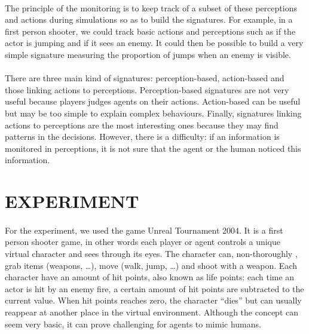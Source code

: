 \documentclass[a4paper,twocolumn]{article}
\begin{document}
\paragraph{}%
The principle of the monitoring is to keep track of a subset of these perceptions and actions during simulations so as to build the signatures. For example, in a first person shooter, we could track basic actions and perceptions such as if the actor is jumping and if it sees an enemy. It could then be possible to build a very simple signature measuring the proportion of jumps when an enemy is visible.
\paragraph{}%
There are three main kind of signatures: perception-based, action-based and those linking actions to perceptions. Perception-based signatures are not very useful because players judges agents on their actions. Action-based can be useful but may be too simple to explain complex behaviours. Finally, signatures linking actions to perceptions are the most interesting ones because they may find patterns in the decisions. However, there is a difficulty: if an information is monitored in perceptions, it is not sure that the agent or the human noticed this information.

\section{EXPERIMENT}
\paragraph{}%
For the experiment, we used the game Unreal Tournament 2004. It is a first person shooter game, in other words each player or agent controls a unique virtual character and sees through its eyes. The character can, non-thoroughly , grab items (weapons, \dots{}), move (walk, jump, \dots{}) and shoot with a weapon. Each character have an amount of hit points, also known as life points: each time an actor is hit by an enemy fire, a certain amount of hit points are subtracted to the current value. When hit points reaches zero, the character ``dies'' but can usually reappear at another place in the virtual environment. Although the concept can seem very basic, it can prove challenging for agents to mimic humans.
\end{document}
